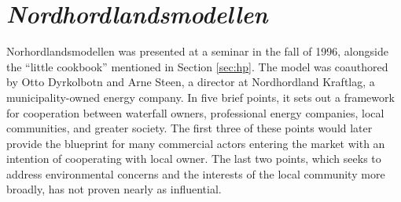 
\section{{\it Nordhordlandsmodellen}}

Norhordlandsmodellen was presented at a seminar in the fall of 1996, alongside the ``little cookbook'' mentioned in Section \ref{sec:hp}. The model was coauthored by Otto Dyrkolbotn and Arne Steen, a director at Nordhordland Kraftlag, a municipality-owned energy company. In five brief points, it sets out a framework for cooperation between waterfall owners, professional energy companies, local communities, and greater society. The first three of these points would later provide the blueprint for many commercial actors entering the market with an intention of cooperating with local owner. The last two points, which seeks to address environmental concerns and the interests of the local community more broadly, has not proven nearly as influential.

